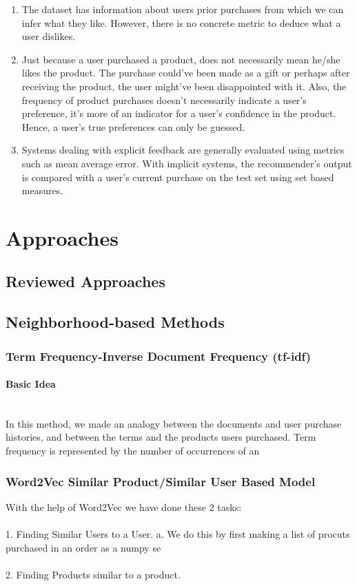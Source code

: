 \documentclass[letterpaper,12pt]{article}
\begin{document}
\begin{enumerate}
	\item The dataset has information about users prior purchases from which we can infer what they like. However, there is no concrete metric to deduce what a user dislikes.
	\item Just because a user purchased a product, does not necessarily mean he/she likes the product. The purchase could've been made as a gift or perhaps after receiving the product, the user might've been disappointed with it. Also, the frequency of product purchases doesn't necessarily indicate a user's preference, it's more of an indicator for a user's confidence in the product. Hence, a user's true preferences can only be guessed.
	\item Systems dealing with explicit feedback are generally evaluated using metrics such as mean average error. With implicit systems, the recommender's output is compared with a user's current purchase on the test set using set based measures.
\end{enumerate}

\section{Approaches}

\subsection{Reviewed Approaches}

\subsection{Neighborhood-based Methods}
\subsubsection{Term Frequency-Inverse Document Frequency (tf-idf)}
\paragraph{Basic Idea}\mbox{}\\
In this method, we made an analogy between the documents and user purchase histories, and between the terms and the products users purchased. Term frequency is represented by the number of occurrences of an 

\subsubsection{Word2Vec Similar Product/Similar User Based Model}
With the help of Word2Vec we have done these 2 tasks:
\\\\ 1. Finding Similar Users to a User.
		a. We do this by first making a list of procuts purchased in an order as a numpy se
\\\\ 2. Finding Products similar to a product.
\end{document}
